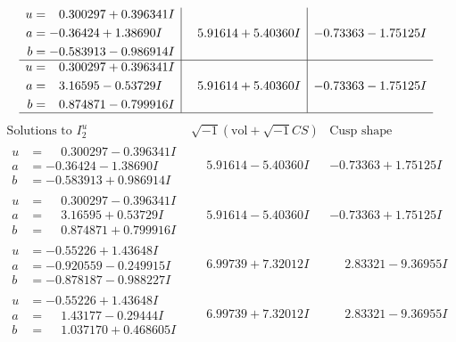 \documentclass[1p]{elsarticle_modified}
\theoremstyle{definition}
\newcommand{\I}{\sqrt{-1}}
\begin{document}
$$\begin{array}{c|c|c}
\begin{aligned}
u &= \phantom{-}0.300297 + 0.396341 I \\
a &= -0.36424 + 1.38690 I \\
b &= -0.583913 - 0.986914 I\end{aligned}
 & \phantom{-}5.91614 + 5.40360 I & -0.73363 - 1.75125 I \\ \hline\begin{aligned}
u &= \phantom{-}0.300297 + 0.396341 I \\
a &= \phantom{-}3.16595 - 0.53729 I \\
b &= \phantom{-}0.874871 - 0.799916 I\end{aligned}
 & \phantom{-}5.91614 + 5.40360 I & -0.73363 - 1.75125 I\\
 \hline 
 \end{array}$$\newpage$$\begin{array}{c|c|c}  
\text{Solutions to }I^u_{2}& \I (\text{vol} + \sqrt{-1}CS) & \text{Cusp shape}\\
 \hline 
\begin{aligned}
u &= \phantom{-}0.300297 - 0.396341 I \\
a &= -0.36424 - 1.38690 I \\
b &= -0.583913 + 0.986914 I\end{aligned}
 & \phantom{-}5.91614 - 5.40360 I & -0.73363 + 1.75125 I \\ \hline\begin{aligned}
u &= \phantom{-}0.300297 - 0.396341 I \\
a &= \phantom{-}3.16595 + 0.53729 I \\
b &= \phantom{-}0.874871 + 0.799916 I\end{aligned}
 & \phantom{-}5.91614 - 5.40360 I & -0.73363 + 1.75125 I \\ \hline\begin{aligned}
u &= -0.55226 + 1.43648 I \\
a &= -0.920559 - 0.249915 I \\
b &= -0.878187 - 0.988227 I\end{aligned}
 & \phantom{-}6.99739 + 7.32012 I & \phantom{-}2.83321 - 9.36955 I \\ \hline\begin{aligned}
u &= -0.55226 + 1.43648 I \\
a &= \phantom{-}1.43177 - 0.29444 I \\
b &= \phantom{-}1.037170 + 0.468605 I\end{aligned}
 & \phantom{-}6.99739 + 7.32012 I & \phantom{-}2.83321 - 9.36955 I \\ \hline\begin{aligned}

\end{aligned}
\end{array}$$
\end{document}
